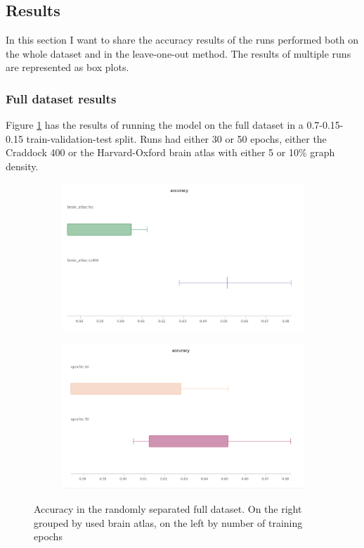 	\subsection{Results}
	In this section I want to share the accuracy results of the runs performed both on the whole dataset and in the leave-one-out method. The results of multiple runs are represented as box plots.
	
	\subsubsection{Full dataset results}
	
	Figure \ref{fig:full_dataset} has the results of running the model on the full dataset in a 0.7-0.15-0.15 train-validation-test split. Runs had either 30 or 50 epochs, either the Craddock 400 or the Harvard-Oxford brain atlas with either 5 or 10\% graph density.
	
	\begin{figure}[!h]
		\centering
		\begin{subfigure}[b]{0.45\textwidth}
			\centering
			\includegraphics[width=\textwidth]{figures/all_atlas.png}
		\end{subfigure}
		\hfill
		\begin{subfigure}[b]{0.45\textwidth}
			\centering
			\includegraphics[width=\textwidth]{figures/all_epochs.png}
		\end{subfigure}
		\caption{Accuracy in the randomly separated full dataset. On the right grouped by used brain atlas, on the left by number of training epochs}
		\label{fig:full_dataset}
	\end{figure}
	

